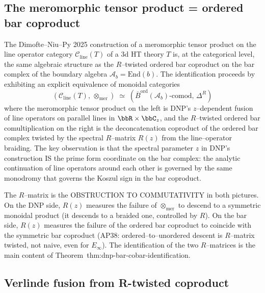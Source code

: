 \documentclass[11pt]{article}
\newcommand{\cA}{\mathcal{A}}
\newcommand{\cC}{\mathcal{C}}
\newcommand{\barB}{\overline{B}}
\begin{document}

\subsection{The meromorphic tensor product = ordered bar coproduct}

The Dimofte--Niu--Py 2025 construction of a meromorphic tensor product on
the line operator category $\cC_{\mathrm{line}}(T)$ of a 3d HT theory $T$
is, at the categorical level, the same algebraic structure as the
$R$--twisted ordered bar coproduct on the bar complex of the boundary
algebra $\cA_b = \mathrm{End}(b)$.  The identification proceeds by
exhibiting an explicit equivalence of monoidal categories
\[
  (\cC_{\mathrm{line}}(T),\, \otimes_{\mathrm{mer}})
  \;\simeq\;
  (\barB^{\mathrm{ord}}(\cA_b)\text{-}\mathrm{comod},\, \Delta^R)
\]
where the meromorphic tensor product on the left is DNP's
$z$--dependent fusion of line operators on parallel lines in
$\bbR \times \bbC_z$, and the $R$--twisted ordered bar comultiplication on
the right is the deconcatenation coproduct of the ordered bar complex
twisted by the spectral $R$--matrix $R(z)$ from the line--operator
braiding.  The key observation is that the spectral parameter $z$ in DNP's
construction IS the prime form coordinate on the bar complex: the
analytic continuation of line operators around each other is governed by
the same monodromy that governs the Koszul sign in the bar coproduct.

The $R$--matrix is the OBSTRUCTION TO COMMUTATIVITY in both pictures.  On
the DNP side, $R(z)$ measures the failure of $\otimes_{\mathrm{mer}}$ to
descend to a symmetric monoidal product (it descends to a braided one,
controlled by $R$).  On the bar side, $R(z)$ measures the failure of the
ordered bar coproduct to coincide with the symmetric bar coproduct
(AP38: ordered--to--unordered descent is $R$--matrix twisted, not naive,
even for $E_\infty$).  The identification of the two $R$--matrices is the
main content of Theorem~\textup{thm:dnp-bar-cobar-identification}.

\subsection{Verlinde fusion from R-twisted coproduct}
\end{document}
